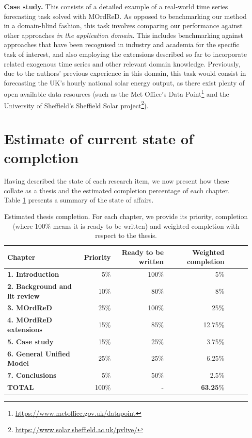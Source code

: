 \documentclass[pdftex,12pt,a4paper]{article}
\theoremstyle{definition}
\theoremstyle{remark}
\begin{document}
\textbf{Case study.} This consists of a detailed example of a real-world time series forecasting task solved with MOrdReD. As opposed to benchmarking our method in a domain-blind fashion, this task involves comparing our performance against other approaches \textit{in the application domain}. This includes benchmarking against approaches that have been recognised in industry and academia for the specific task of interest, and also employing the extensions described so far to incorporate related exogenous time series and other relevant domain knowledge. Previously, due to the authors' previous experience in this domain, this task would consist in forecasting the UK's hourly national solar energy output, as there exist plenty of open available data resources (such as the Met Office's Data Point\footnote{\url{https://www.metoffice.gov.uk/datapoint}} and the University of Sheffield's Sheffield Solar project\footnote{\url{https://www.solar.sheffield.ac.uk/pvlive/}}).


\section{Estimate of current state of completion}
Having described the state of each research item, we now present how these collate as a thesis and the estimated completion percentage of each chapter. Table \ref{tab:completion} presents a summary of the state of affairs.

\begin{table} \centering
\begin{tabular}{lrrrrrr}
\toprule
{Chapter} &     Priority &  Ready to be written &  Weighted completion \\
\midrule
\textbf{1. Introduction} &              5\% &   100\% &            5\% \\
\textbf{2. Background and lit review } &              10\% &   80\% &            8\% \\
\textbf{3. MOrdReD} &              25\% &   100\% &            25\% \\
\textbf{4. MOrdReD extensions} &              15\% &   85\% &            12.75\% \\
\textbf{5. Case study} &              15\% &   25\% &            3.75\%\\
\textbf{6. General Unified Model} &              25\% &   25\% &            6.25\% \\
\textbf{7. Conclusions} &              5\% &   50\% &            2.5\%  \\
\midrule
\textbf{TOTAL} &              100\% &   - &            \textbf{63.25}\%  \\
\bottomrule
\end{tabular}
\caption{Estimated thesis completion. For each chapter, we provide its priority, completion (where 100\% means it is ready to be written) and weighted completion with respect to the thesis.}
\label{tab:completion}
\end{table}
\end{document}
